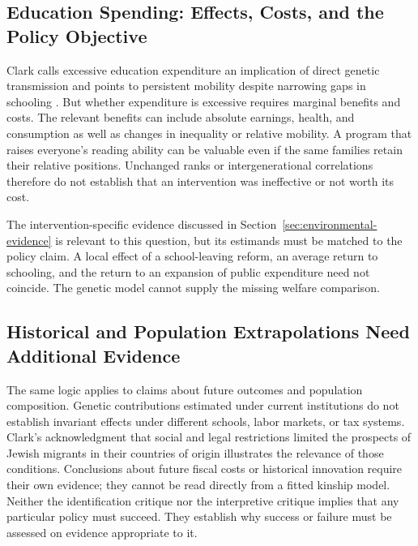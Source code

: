 \subsection{Education Spending: Effects, Costs, and the Policy Objective}
Clark calls excessive education expenditure an implication of direct
genetic transmission and points to persistent mobility despite narrowing
gaps in schooling \citep[p.~9]{Clark2026}. But whether expenditure is
excessive requires marginal benefits and costs. The relevant benefits can
include absolute earnings, health, and consumption as well as changes in
inequality or relative mobility. A program that raises everyone's reading
ability can be valuable even if the same families retain their relative
positions. Unchanged ranks or intergenerational correlations therefore do
not establish that an intervention was ineffective or not worth its cost.

The intervention-specific evidence discussed in
Section~\ref{sec:environmental-evidence} is relevant to this question, but
its estimands must be matched to the policy claim. A local effect of a
school-leaving reform, an average return to schooling, and the return to
an expansion of public expenditure need not coincide. The genetic model
cannot supply the missing welfare comparison.

\subsection{Historical and Population Extrapolations Need Additional Evidence}
The same logic applies to claims about future outcomes and population
composition. Genetic contributions estimated under current institutions
do not establish invariant effects under different schools, labor markets,
or tax systems. Clark's acknowledgment that social and legal restrictions
limited the prospects of Jewish migrants in their countries of origin
\citep[p.~291, n.~105]{Clark2026} illustrates the relevance of those
conditions. Conclusions about future fiscal costs or historical innovation
require their own evidence; they cannot be read directly from a fitted
kinship model. Neither the identification critique nor the interpretive
critique implies that any particular policy must succeed. They establish
why success or failure must be assessed on evidence appropriate to it.
